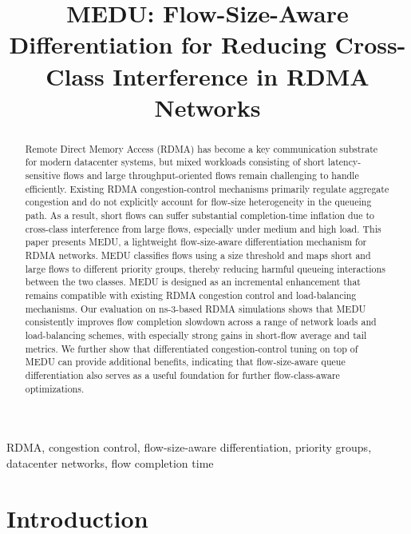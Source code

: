 \documentclass[conference]{IEEEtran}
\begin{document}
\title{MEDU: Flow-Size-Aware Differentiation for Reducing Cross-Class Interference in RDMA Networks}

\author{
}

\maketitle

\begin{abstract}
Remote Direct Memory Access (RDMA) has become a key communication substrate for modern datacenter systems, but mixed workloads consisting of short latency-sensitive flows and large throughput-oriented flows remain challenging to handle efficiently. Existing RDMA congestion-control mechanisms primarily regulate aggregate congestion and do not explicitly account for flow-size heterogeneity in the queueing path. As a result, short flows can suffer substantial completion-time inflation due to cross-class interference from large flows, especially under medium and high load. This paper presents MEDU, a lightweight flow-size-aware differentiation mechanism for RDMA networks. MEDU classifies flows using a size threshold and maps short and large flows to different priority groups, thereby reducing harmful queueing interactions between the two classes. MEDU is designed as an incremental enhancement that remains compatible with existing RDMA congestion control and load-balancing mechanisms. Our evaluation on ns-3-based RDMA simulations shows that MEDU consistently improves flow completion slowdown across a range of network loads and load-balancing schemes, with especially strong gains in short-flow average and tail metrics. We further show that differentiated congestion-control tuning on top of MEDU can provide additional benefits, indicating that flow-size-aware queue differentiation also serves as a useful foundation for further flow-class-aware optimizations.
\end{abstract}

\begin{IEEEkeywords}
RDMA, congestion control, flow-size-aware differentiation, priority groups, datacenter networks, flow completion time
\end{IEEEkeywords}

\section{Introduction}
\end{document}
